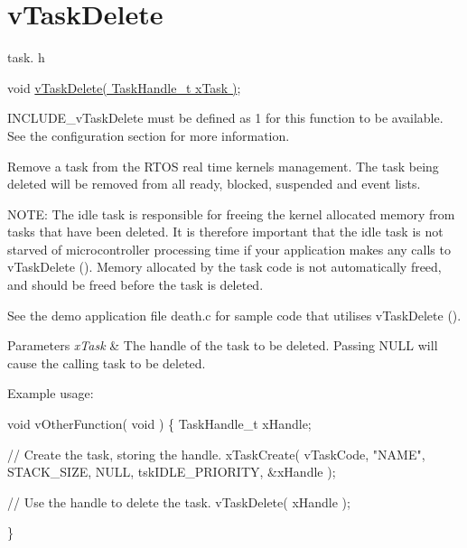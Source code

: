 \hypertarget{group__v_task_delete}{}\section{v\+Task\+Delete}
\label{group__v_task_delete}
task. h 
\begin{DoxyPre}void \hyperlink{task_8h_a27ff4ebce26565bef136bda84201ff80}{vTaskDelete( TaskHandle\_t xTask )};\end{DoxyPre}


I\+N\+C\+L\+U\+D\+E\+\_\+v\+Task\+Delete must be defined as 1 for this function to be available. See the configuration section for more information.

Remove a task from the R\+T\+OS real time kernel\textquotesingle{}s management. The task being deleted will be removed from all ready, blocked, suspended and event lists.

N\+O\+TE\+: The idle task is responsible for freeing the kernel allocated memory from tasks that have been deleted. It is therefore important that the idle task is not starved of microcontroller processing time if your application makes any calls to v\+Task\+Delete (). Memory allocated by the task code is not automatically freed, and should be freed before the task is deleted.

See the demo application file death.\+c for sample code that utilises v\+Task\+Delete ().


\begin{DoxyParams}{Parameters}
{\em x\+Task} & The handle of the task to be deleted. Passing N\+U\+LL will cause the calling task to be deleted.\\
\hline
\end{DoxyParams}
Example usage\+: 
\begin{DoxyPre}
void vOtherFunction( void )
\{
TaskHandle\_t xHandle;
\begin{DoxyVerb}// Create the task, storing the handle.
xTaskCreate( vTaskCode, "NAME", STACK_SIZE, NULL, tskIDLE_PRIORITY, &xHandle );

// Use the handle to delete the task.
vTaskDelete( xHandle );
\end{DoxyVerb}

\}
  \end{DoxyPre}
 